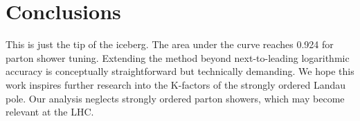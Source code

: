 \section{Conclusions}\label{sec:conclusions}

This is just the tip of the iceberg. The area under the curve reaches
0.924 for parton shower tuning. Extending the method beyond
next-to-leading logarithmic accuracy is conceptually straightforward but
technically demanding. We hope this work inspires further research into
the K-factors of the strongly ordered Landau pole. Our analysis neglects
strongly ordered parton showers, which may become relevant at the LHC.

